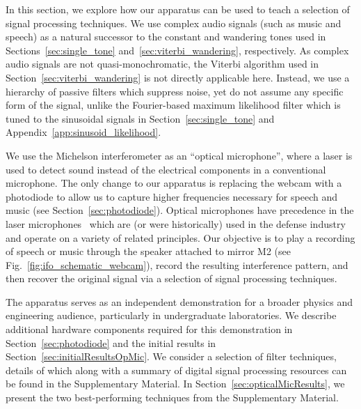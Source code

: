 \documentclass[paper-main.tex]{subfiles}
\begin{document}
In this section, we explore how our apparatus can be used to teach a selection of signal processing techniques. 
We use complex audio signals (such as music and speech) as a natural successor to the constant and wandering tones used in Sections~\ref{sec:single_tone} and~\ref{sec:viterbi_wandering}, respectively.
As complex audio signals are not quasi-monochromatic, the Viterbi algorithm used in Section~\ref{sec:viterbi_wandering} is not directly applicable here. 
Instead, we use a hierarchy of passive filters which suppress noise, yet do not assume any specific form of the signal, unlike the Fourier-based maximum likelihood filter which is tuned to the sinusoidal signals in Section~\ref{sec:single_tone} and Appendix~\ref{app:sinusoid_likelihood}.

We use the Michelson interferometer as an ``optical microphone'', where a laser is used to detect sound instead of the electrical components in a conventional microphone.
The only change to our apparatus is replacing the webcam with a photodiode to allow us to capture higher frequencies necessary for speech and music (see Section~\ref{sec:photodiode}). 
Optical microphones have precedence in the laser microphones~\cite{laser_microphone} which are (or were historically) used in the defense industry and operate on a variety of related principles. 
Our objective is to play a recording of speech or music through the speaker attached to mirror M2 (see Fig.~\ref{fig:ifo_schematic_webcam}), record the resulting interference pattern, and then recover the original signal via a selection of signal processing techniques. 



The apparatus serves as an independent demonstration for a broader physics and engineering audience, particularly in undergraduate laboratories. 
We describe additional hardware components required for this demonstration in Section~\ref{sec:photodiode} and the initial results in Section~\ref{sec:initialResultsOpMic}. 
We consider a selection of filter techniques, details of which along with a summary of digital signal processing resources can be found in the Supplementary Material. 
In Section~\ref{sec:opticalMicResults}, we present the two best-performing techniques from the Supplementary Material. 
\end{document}
